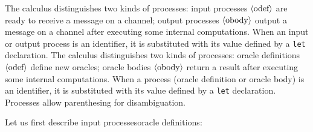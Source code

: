 \ifchannels
The calculus distinguishes two kinds of processes: input processes
$\langle\textrm{odef}\rangle$ are ready to receive a message on a channel; 
output processes $\langle\textrm{obody}\rangle$ 
output a message on a channel after executing some internal computations.
When an input or output process is an identifier, it is substituted with 
its value defined by a \texttt{let} declaration.
\else
The calculus distinguishes two kinds of processes: oracle definitions
$\langle\textrm{odef}\rangle$ define new oracles; oracle bodies $\langle\textrm{obody}\rangle$ return a
result after executing some internal computations.  When a process
(oracle definition or oracle body) is an identifier, it is substituted
with its value defined by a \texttt{let} declaration.
\fi
Processes allow parenthesing for disambiguation.

Let us first describe \ifchannels input processes\else oracle definitions\fi:
